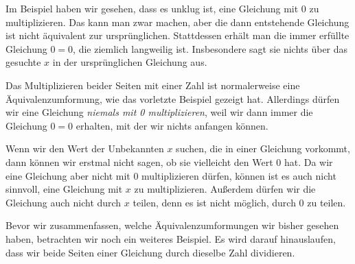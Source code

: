 \documentclass[../../main.tex]{subfiles}
\begin{document}
Im Beispiel haben wir gesehen, dass es unklug ist, eine Gleichung mit 0 zu multiplizieren. Das kann man zwar machen, aber die dann entstehende Gleichung ist nicht äquivalent zur ursprünglichen. Stattdessen erhält man die immer erfüllte Gleichung $0=0$, die ziemlich langweilig ist. Insbesondere sagt sie nichts über das gesuchte $x$ in der ursprünglichen Gleichung aus.

Das Multiplizieren beider Seiten mit einer Zahl ist normalerweise eine Äquivalenzumformung, wie das vorletzte Beispiel gezeigt hat. Allerdings dürfen wir eine Gleichung \emph{niemals mit 0 multiplizieren}, weil wir dann immer die Gleichung $0=0$ erhalten, mit der wir nichts anfangen können.

Wenn wir den Wert der Unbekannten $x$ suchen, die in einer Gleichung vorkommt, dann können wir erstmal nicht sagen, ob sie vielleicht den Wert $0$ hat. Da wir eine Gleichung aber nicht mit $0$ multiplizieren dürfen, können ist es auch nicht sinnvoll, eine Gleichung mit $x$ zu multiplizieren. Außerdem dürfen wir die Gleichung auch nicht durch $x$ teilen, denn es ist nicht möglich, durch $0$ zu teilen.

Bevor wir zusammenfassen, welche Äquivalenzumformungen wir bisher gesehen haben, betrachten wir noch ein weiteres Beispiel. Es wird darauf hinauslaufen, dass wir beide Seiten einer Gleichung durch dieselbe Zahl dividieren.
\end{document}
